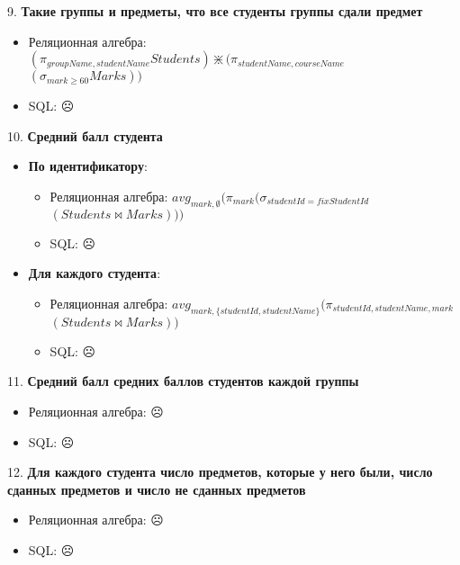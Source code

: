 \documentclass[11pt,a4paper,oneside]{article}
\begin{document}
9. \textbf{Такие группы и предметы, что все студенты группы сдали предмет}
\begin{itemize}
\item Реляционная алгебра: $(\pi_{groupName, studentName} Students) \divideontimes (\pi_{studentName, courseName}$ $(\sigma_{mark \ge 60} Marks))$
\item SQL: $\frownie{}$
\end{itemize}

10. \textbf{Средний балл студента}
\begin{itemize}
\item \textbf{По идентификатору}:
  \begin{itemize}
  \item Реляционная алгебра: $avg_{mark, \emptyset} (\pi_{mark} (\sigma_{studentId = fixStudentId}$ $(Students \bowtie Marks)))$
  \item SQL: $\frownie{}$
  \end{itemize}
\item \textbf{Для каждого студента}:
  \begin{itemize}
  \item Реляционная алгебра: $avg_{mark, \{studentId, studentName\}} (\pi_{studentId, studentName, mark}$ $(Students \bowtie Marks))$
  \item SQL: $\frownie{}$
  \end{itemize}
\end{itemize}

11. \textbf{Средний балл средних баллов студентов каждой группы}
\begin{itemize}
\item Реляционная алгебра: $\frownie{}$
\item SQL: $\frownie{}$
\end{itemize}

12. \textbf{Для каждого студента число предметов, которые у него были, число сданных предметов и число не сданных предметов}
\begin{itemize}
\item Реляционная алгебра: $\frownie{}$
\item SQL: $\frownie{}$
\end{itemize}
\end{document}
